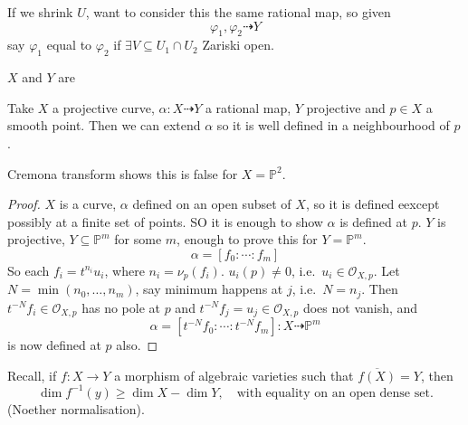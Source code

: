 \documentclass{article}
\newcommand{\proj}{\mathbb{P}}
\begin{document}
If we shrink $U$, want to consider this the same rational map, so given
\begin{equation*}
    \varphi_1, \varphi_2 \dashrightarrow Y
\end{equation*}
say $\varphi_1$ equal to $\varphi_2$ if $\exists V \subseteq U_1 \cap U_2$ Zariski open.
\begin{defi}
    $X$ and $Y$ are
\end{defi}
\begin{prop}
    Take $X$ a projective curve, $\alpha: X \dashrightarrow Y$ a rational map, $Y$ projective and $p \in X$ a smooth point.
    Then we can extend $\alpha$ so it is well defined in a neighbourhood of $p$.
\end{prop}
\begin{remark}
    Cremona transform shows this is false for $X = \proj^2$.
\end{remark}
\begin{proof}
    $X$ is a curve, $\alpha$ defined on an open subset of $X$, so it is defined eexcept possibly at a finite set of points.
    SO it is enough to show $\alpha$ is defined at $p$.
    $Y$ is projective, $Y \subseteq \proj^m$ for some $m$, enough to prove this for $Y = \proj^m$. %
    \begin{equation*}
        \alpha = [f_0 : \dotsb : f_m]
    \end{equation*}
    So each $f_i = t^{n_i} u_i$, where $n_i = \nu_p(f_i)$. $u_i(p) \neq 0$, i.e.\ $u_i \in \mathcal{O}_{X, p}$.
    Let $N = \min(n_0, \dotsc, n_m)$, say minimum happens at $j$, i.e.\ $N = n_j$.
    Then $t^{-N} f_i \in \mathcal{O}_{X, p}$ has no pole at $p$ and $t^{-N} f_j = u_j \in \mathcal{O}_{X, p}$ does not vanish, and
    \begin{equation*}
        \alpha = [t^{-N} f_0: \dotsb : t^{-N} f_m] : X \dashrightarrow \proj^m
    \end{equation*}
    is now defined at $p$ also.
\end{proof}
Recall, if $f: X \to Y$ a morphism of algebraic varieties such that $\overline{f(X)} = Y$, then
\begin{equation*}
    \dim f^{-1}(y) \geq \dim X - \dim Y, \quad \text{with equality on an open dense set.}
\end{equation*}
(Noether normalisation).
\end{document}
